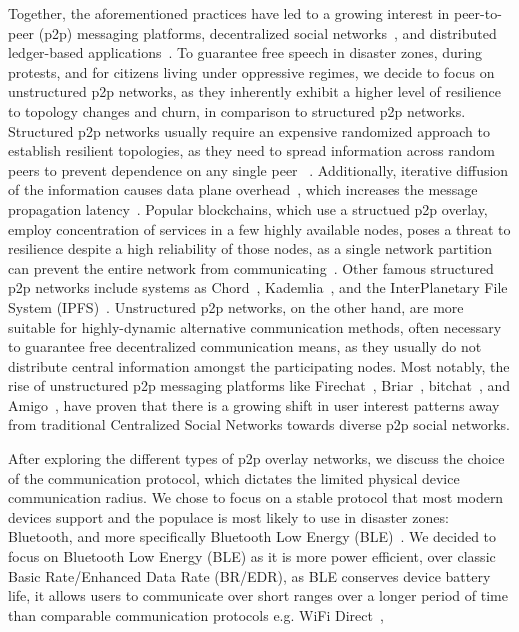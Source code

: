 Together, the aforementioned practices have led to a growing interest in peer-to-peer (p2p) messaging platforms, decentralized social networks~\cite{bluesky,mastodon}, and distributed ledger-based applications~\cite{bitcoin,ethereum}.
To guarantee free speech in disaster zones, during protests, and for citizens living under oppressive regimes, we decide to focus on unstructured p2p networks, as they inherently exhibit a higher level of resilience to topology changes and churn, in comparison to structured p2p networks.
Structured p2p networks usually require an expensive randomized approach to establish resilient topologies, as they need to spread information across random peers to prevent dependence on any single peer ~\cite{guzman22, guzman25, kademlia}. Additionally, iterative diffusion of the information causes data plane overhead~\cite{guzman25}, which increases the message propagation latency~\cite{guzman22, guzman23}.
Popular blockchains, which use a structued p2p overlay, employ concentration of services in a few highly available nodes, poses a threat to resilience despite a high reliability of those nodes, as a single network partition can prevent the entire network from communicating~\cite{guzman24}.
Other famous structured p2p networks include systems as Chord~\cite{chord}, Kademlia~\cite{kademlia}, and the InterPlanetary File System (IPFS)~\cite{ipfs}.
Unstructured p2p networks, on the other hand, are more suitable for highly-dynamic alternative communication methods, often necessary to guarantee free decentralized communication means, as they usually do not distribute central information amongst the participating nodes.
Most notably, the rise of unstructured p2p messaging platforms like Firechat~\cite{firechat}, Briar~\cite{briar}, bitchat~\cite{bitchat}, and Amigo~\cite{amigo}, have proven that there is a growing shift in user interest patterns away from traditional Centralized Social Networks towards diverse p2p social networks.

After exploring the different types of p2p overlay networks, we discuss the choice of the communication protocol, which dictates the limited physical device communication radius.
We chose to focus on a stable protocol that most modern devices support and the populace is most likely to use in disaster zones: Bluetooth, and more specifically Bluetooth Low Energy (BLE)~\cite{bt-spec}.
We decided to focus on Bluetooth Low Energy (BLE) as it is more power efficient, over classic Basic Rate/Enhanced Data Rate (BR/EDR), as BLE conserves device battery life, it allows users to communicate over short ranges over a longer period of time than comparable communication protocols e.g. WiFi Direct~\cite{wifi-ble-power}, %

